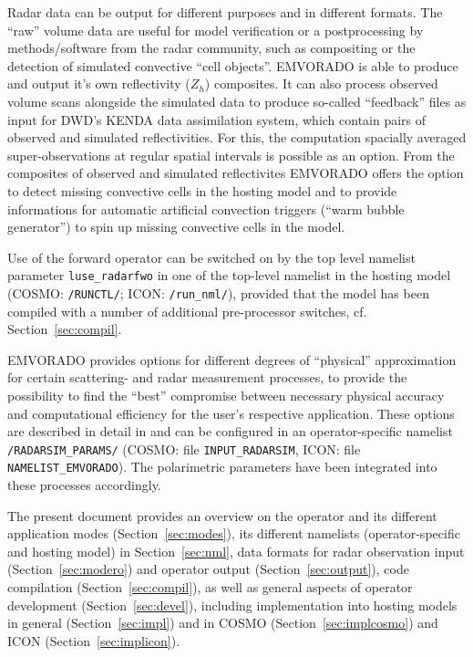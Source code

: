\documentclass[10pt,a4paper,twoside,headinclude,footinclude,parskip=half]{scrartcl}
\newcommand{\citeP}[1]{\citet{#1}}
\newcommand{\srcform}[1]{\mbox{\texttt{#1}}\xspace}%
\begin{document}
Radar data can be output for different purposes and in different formats. The ``raw'' volume data are useful for
model verification or a postprocessing by methods/software from the radar community, such
as compositing or the detection of simulated convective ``cell objects''. EMVORADO is able to
produce and output it's own reflectivity ($Z_h$) composites. It can also process observed volume scans alongside the simulated
data to produce so-called ``feedback'' files as input for DWD's KENDA data assimilation system, which contain
pairs of observed and simulated reflectivities. For this, the computation spacially averaged super-observations at regular spatial intervals is possible as an option.
From the composites of observed and simulated reflectivites EMVORADO offers the option to detect missing convective cells
in the hosting model and to provide informations for automatic artificial convection triggers (``warm bubble generator'')
to spin up missing convective cells in the model.

Use of the forward operator can be switched on by the top level namelist parameter \srcform{luse_radarfwo} in one of the
top-level namelist in the hosting model (COSMO: \srcform{/RUNCTL/}; ICON: \srcform{/run_nml/}),
provided that the model has been compiled with a number of additional pre-processor switches, cf. Section~\ref{sec:compil}.

EMVORADO provides options for different degrees of ``physical'' approximation for certain scattering- and radar measurement
processes, to provide the possibility to find the ``best'' compromise between
necessary physical accuracy and computational efficiency for the user's respective application.
These options are described in detail in \citeP{zeng2016a} and can be configured in
an operator-specific namelist \srcform{/RADARSIM_PARAMS/} (COSMO: file \srcform{INPUT_RADARSIM}, ICON: file \srcform{NAMELIST_EMVORADO}).
The polarimetric parameters have been integrated into these processes accordingly.

The present document provides an overview on the operator and its different
application modes (Section~\ref{sec:modes}), its different namelists
(operator-specific and hosting model) in Section~\ref{sec:nml},
data formats for radar observation input (Section~\ref{sec:modero})
and operator output (Section~\ref{sec:output}), code compilation (Section~\ref{sec:compil}),
as well as general aspects of operator development (Section~\ref{sec:devel}), including implementation
into hosting models in general (Section~\ref{sec:impl}) and in COSMO (Section~\ref{sec:implcosmo}) and ICON (Section~\ref{sec:implicon}).
\end{document}
